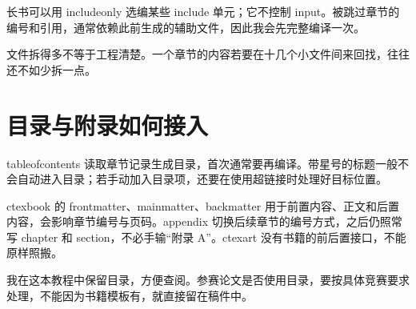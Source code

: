 长书可以用 includeonly 选编某些 include 单元；它不控制 input。被跳过章节的编号和引用，通常依赖此前生成的辅助文件，因此我会先完整编译一次。

文件拆得多不等于工程清楚。一个章节的内容若要在十几个小文件间来回找，往往还不如少拆一点。

\section{目录与附录如何接入}


tableofcontents 读取章节记录生成目录，首次通常要再编译。带星号的标题一般不会自动进入目录；若手动加入目录项，还要在使用超链接时处理好目标位置。

ctexbook 的 frontmatter、mainmatter、backmatter 用于前置内容、正文和后置内容，会影响章节编号与页码。appendix 切换后续章节的编号方式，之后仍照常写 chapter 和 section，不必手输“附录 A”。ctexart 没有书籍的前后置接口，不能原样照搬。

我在这本教程中保留目录，方便查阅。参赛论文是否使用目录，要按具体竞赛要求处理，不能因为书籍模板有，就直接留在稿件中。
